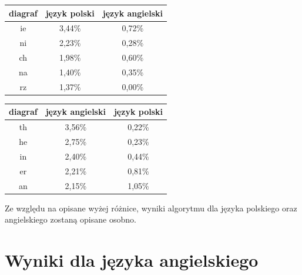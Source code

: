 \documentclass[brudnopis]{xmgr}
\begin{document}
\begin{tabular}{ c | c | c }
  diagraf & język polski & język angielski \\
  \hline
  ie &	3,44\% &	0,72\% \\
  ni &	2,23\% &	0,28\% \\
  ch &	1,98\% &	0,60\% \\
  na &	1,40\% &	0,35\% \\
  rz &	1,37\% &	0,00\% \\
\end{tabular}
\begin{tabular}{ c | c | c }
  diagraf & język angielski & język polski \\
  \hline
  th &	3,56\% &	0,22\% \\
  he &	2,75\% &	0,23\% \\
  in &	2,40\% &	0,44\% \\
  er &	2,21\% &	0,81\% \\
  an &	2,15\% &	1,05\% \\
\end{tabular}\newline\newline

Ze względu na opisane wyżej różnice, wyniki algorytmu dla języka polskiego oraz angielskiego zostaną opisane osobno.


\section{Wyniki dla języka angielskiego}
\end{document}
